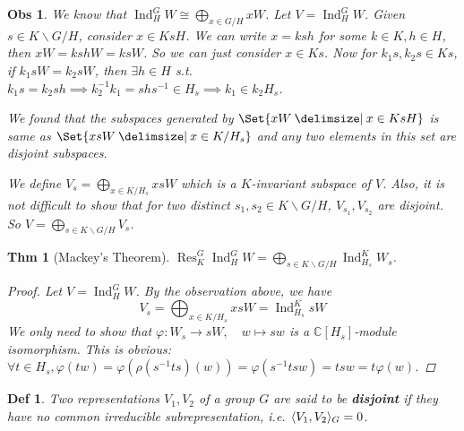 \documentclass[a4paper]{article}
\DeclarePairedDelimiter{\inpd}{\langle}{\rangle} %
\newcommand*{\Cb}{\mathbb{C}}
\DeclareMathOperator{\Res}{Res}
\DeclareMathOperator{\Ind}{Ind}
\newcommand*\bsl{\backslash}
\providecommand\given{}
\newcommand*\SetSymbol[1][]{%
  \nonscript\:#1\vert
  \allowbreak
  \nonscript\:
\mathopen{}}
\renewcommand\given{\SetSymbol[\delimsize]}
\renewcommand\given{\SetSymbol[\delimsize]}
\theoremstyle{mystyle}
\newtheorem{theorem}{Thm}
\newtheorem{observation}{Obs}
\newtheorem{definition}{Def}
\begin{document}
\begin{observation}
  We know that $\Ind^G_H W \cong \bigoplus_{x\in G/H} xW$. Let $V = \Ind^G_H W$.
  Given $s \in K\bsl G/H$, consider $x \in KsH$. We can write $x = ksh$ for
  some $k\in K, h \in H$, then $xW = kshW = ksW$. So we can just consider
  $x \in Ks$.
  Now for $k_1s, k_2s\in Ks$, if $k_1sW = k_2sW$, then $\exists h\in H$ s.t.
  $k_1s = k_2sh \implies k_2^{-1}k_1 = shs^{-1} \in H_s \implies
  k_1 \in k_2H_s$.

  We found that the subspaces generated by $\Set{ xW \given x\in KsH}$ is
  same as $\Set{ xsW \given x \in K/H_s}$ and any two elements in this
  set are disjoint subspaces.

  We define $\displaystyle V_s = \bigoplus_{x\in K/H_s} xsW$ which is a
  $K$-invariant subspace of $V$. Also, it is not difficult to show that for
  two distinct $s_1, s_2 \in K\bsl G/H$, $V_{s_1}, V_{s_2}$ are disjoint.
  So $\displaystyle V = \bigoplus_{s\in K\bsl G/H} V_s$.
\end{observation}

\begin{theorem}[Mackey's Theorem]
  \label{thm:mackey}
  $\displaystyle \Res^G_K \Ind^G_H W = \bigoplus_{s\in K\bsl G/H} \Ind^K_{H_s} W_s$.
  \begin{proof}
    Let $V = \Ind^G_H W$. By the observation above, we have
    \[
      V_s = \bigoplus_{x\in K/H_s} xsW = \Ind^K_{H_s} sW
    \]
    We only need to show that $\varphi: W_s \to sW, \quad w \mapsto sw$
    is a $\Cb[H_s]$-module isomorphism.
    This is obvious: $\forall t\in H_s, \varphi(tw) = \varphi(\rho(s^{-1}ts)(w))
    = \varphi(s^{-1}tsw) = tsw = t\varphi(w)$.
  \end{proof}
\end{theorem}

\begin{definition}
  Two representations $V_1, V_2$ of a group $G$ are said to be {\bf disjoint}
  if they have no common irreducible subrepresentation, i.e.
  $\inpd{V_1, V_2}_G = 0$.
\end{definition}
\end{document}
